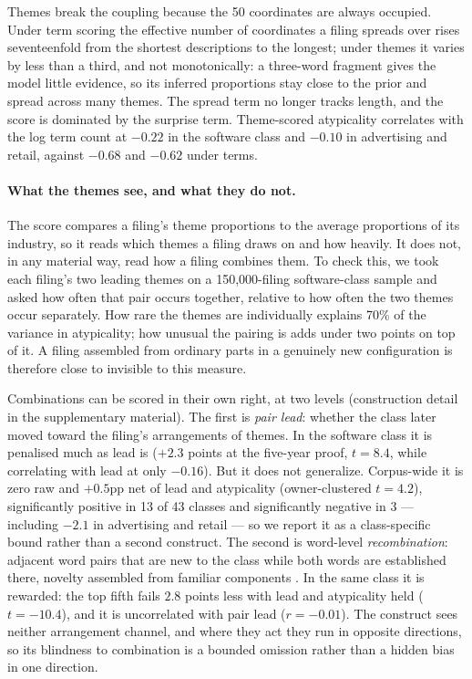 Themes break the coupling because the 50 coordinates are always occupied.
Under term scoring the effective number of coordinates a filing spreads over
rises seventeenfold from the shortest descriptions to the longest; under
themes it varies by less than a third, and not monotonically: a three-word
fragment gives the model little evidence, so its inferred proportions stay
close to the prior and spread across many themes. The spread term no longer
tracks length, and the score is dominated by the surprise term.
Theme-scored atypicality correlates with the log term count at $-0.22$ in
the software class and $-0.10$ in advertising and retail, against $-0.68$
and $-0.62$ under terms.

\paragraph{What the themes see, and what they do not.} The score compares a
filing's theme proportions to the average proportions of its industry, so it
reads which themes a filing draws on and how heavily. It does not, in any
material way, read how a filing combines them. To check this, we took
each filing's two leading themes on a 150{,}000-filing software-class
sample and asked how often that pair occurs together, relative to how
often the two themes occur separately. How rare the themes are
individually explains 70\% of the variance in atypicality; how unusual
the pairing is adds under two points on top of it. A filing assembled from ordinary parts in a
genuinely new configuration is therefore close to invisible to this measure.

Combinations can be scored in their own right, at two levels
(construction detail in the supplementary material). The first is
\emph{pair lead}: whether the class later moved toward the filing's
arrangements of themes. In the software class it is penalised much as
lead is ($+2.3$ points at the five-year proof, $t = 8.4$, while
correlating with lead at only $-0.16$). But it does not generalize.
Corpus-wide it is zero raw and $+0.5$pp net of lead and atypicality
(owner-clustered $t = 4.2$), significantly positive in 13 of 43 classes
and significantly negative in 3 --- including $-2.1$ in advertising and
retail --- so we report it as a class-specific bound rather than a second
construct. The second is word-level \emph{recombination}: adjacent word
pairs that are new to the class while both words are established there,
novelty assembled from familiar components
\citep{Fleming2001, Uzzi2013}. In the same class it is rewarded: the top
fifth fails $2.8$ points less with lead and atypicality held
($t = -10.4$), and it is uncorrelated with pair lead ($r = -0.01$). The
construct sees neither arrangement channel, and where they act they run
in opposite directions, so its blindness to combination is a bounded
omission rather than a hidden bias in one direction.

